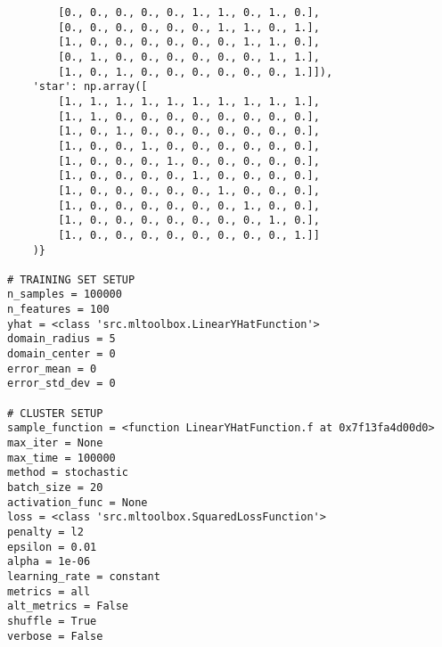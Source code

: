 \documentclass[11pt]{article}
\begin{document}
\begin{verbatim}
        [0., 0., 0., 0., 0., 1., 1., 0., 1., 0.],
        [0., 0., 0., 0., 0., 0., 1., 1., 0., 1.],
        [1., 0., 0., 0., 0., 0., 0., 1., 1., 0.],
        [0., 1., 0., 0., 0., 0., 0., 0., 1., 1.],
        [1., 0., 1., 0., 0., 0., 0., 0., 0., 1.]]),
    'star': np.array([
        [1., 1., 1., 1., 1., 1., 1., 1., 1., 1.],
        [1., 1., 0., 0., 0., 0., 0., 0., 0., 0.],
        [1., 0., 1., 0., 0., 0., 0., 0., 0., 0.],
        [1., 0., 0., 1., 0., 0., 0., 0., 0., 0.],
        [1., 0., 0., 0., 1., 0., 0., 0., 0., 0.],
        [1., 0., 0., 0., 0., 1., 0., 0., 0., 0.],
        [1., 0., 0., 0., 0., 0., 1., 0., 0., 0.],
        [1., 0., 0., 0., 0., 0., 0., 1., 0., 0.],
        [1., 0., 0., 0., 0., 0., 0., 0., 1., 0.],
        [1., 0., 0., 0., 0., 0., 0., 0., 0., 1.]]
    )}

# TRAINING SET SETUP
n_samples = 100000
n_features = 100
yhat = <class 'src.mltoolbox.LinearYHatFunction'>
domain_radius = 5
domain_center = 0
error_mean = 0
error_std_dev = 0

# CLUSTER SETUP
sample_function = <function LinearYHatFunction.f at 0x7f13fa4d00d0>
max_iter = None
max_time = 100000
method = stochastic
batch_size = 20
activation_func = None
loss = <class 'src.mltoolbox.SquaredLossFunction'>
penalty = l2
epsilon = 0.01
alpha = 1e-06
learning_rate = constant
metrics = all
alt_metrics = False
shuffle = True
verbose = False
\end{verbatim}


    
    
    
    
\end{document}
